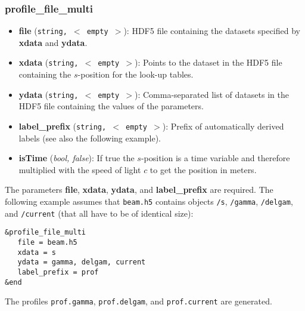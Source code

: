 \documentclass[12pt]{book}
\begin{document}
\subsubsection{\sf profile\_file\_multi}
\begin{itemize}
\item{\bf file} ({\tt string, $<$ empty $>$}): HDF5 file containing the datasets specified by {\bf xdata} and {\bf ydata}.
\item{\bf xdata} ({\tt string, $<$ empty $>$}): Points to the dataset in the HDF5 file containing the $s$-position for the look-up tables.
\item{\bf ydata} ({\tt string, $<$ empty $>$}): Comma-separated list of datasets in the HDF5 file containing the values of the parameters.
\item{\bf label\_prefix} ({\tt string, $<$ empty $>$}): Prefix of automatically derived labels (see also the following example).
\item{\bf isTime} ({\it bool, false}): If true the $s$-position is a time variable and therefore multiplied with the speed of light $c$ to get the position in meters.
\end{itemize}
The parameters {\bf file}, {\bf xdata}, {\bf ydata}, and {\bf label\_prefix} are required. The following example assumes that {\tt beam.h5} contains objects {\tt /s}, {\tt /gamma}, {\tt /delgam}, and {\tt /current} (that all have to be of identical size):
\begin{verbatim}
&profile_file_multi
   file = beam.h5
   xdata = s
   ydata = gamma, delgam, current
   label_prefix = prof
&end
\end{verbatim}
The profiles {\tt prof.gamma}, {\tt prof.delgam}, and {\tt prof.current} are generated.
\end{document}
